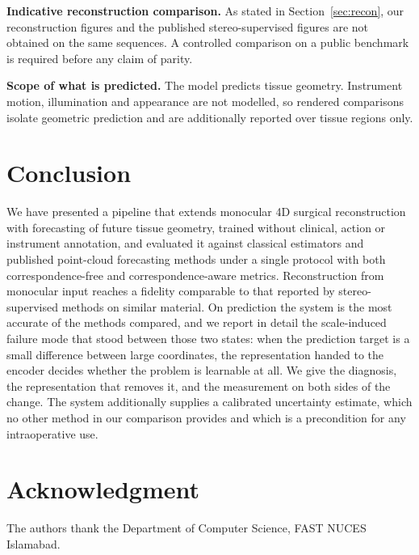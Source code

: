 \documentclass[conference]{IEEEtran}
\begin{document}
\textbf{Indicative reconstruction comparison.} As stated in Section~\ref{sec:recon},
our reconstruction figures and the published stereo-supervised figures are not
obtained on the same sequences. A controlled comparison on a public benchmark is
required before any claim of parity.

\textbf{Scope of what is predicted.} The model predicts tissue geometry. Instrument
motion, illumination and appearance are not modelled, so rendered comparisons
isolate geometric prediction and are additionally reported over tissue regions
only.

\section{Conclusion}

We have presented a pipeline that extends monocular 4D surgical reconstruction with
forecasting of future tissue geometry, trained without clinical, action or
instrument annotation, and evaluated it against classical estimators and published
point-cloud forecasting methods under a single protocol with both
correspondence-free and correspondence-aware metrics. Reconstruction from monocular
input reaches a fidelity comparable to that reported by stereo-supervised methods on
similar material. On prediction the system is the most accurate of the
\nMethods{} methods compared, and we report in detail the scale-induced failure mode
that stood between those two states: when the prediction target is a small difference
between large coordinates, the representation handed to the encoder decides whether
the problem is learnable at all. We give the diagnosis, the representation that
removes it, and the measurement on both sides of the change. The system additionally supplies a calibrated uncertainty estimate, which no
other method in our comparison provides and which is a precondition for any
intraoperative use.

\section*{Acknowledgment}
The authors thank the Department of Computer Science, FAST NUCES Islamabad.



\end{document}
